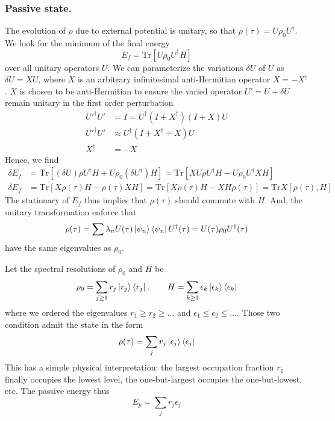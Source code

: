 \documentclass[../../../main.tex]{subfiles}
\begin{document}
\subsubsection{Passive state.}
The evolution of $\rho$ due to external potential is unitary, so that $\rho(\tau ) = U \rho_0 U ^\dagger$.
We look for the minimum of the final energy
\begin{equation*}
  E_f = \mathrm{Tr}  [U \rho_0 U ^\dagger H]
\end{equation*}
over all unitary operators $U$.
We can parameterize the variations $\delta U$ of $U$ as $\delta U = X U$, where $X$ is an arbitrary infinitesimal anti-Hermitian operator $X = -X ^\dagger$.
$X$ is chosen to be anti-Hermitian to ensure the varied operator $U'=U + \delta U$ remain unitary in the first order perturbation
\begin{align*}
  U'^\dagger U' & = I = U^\dagger(I+X ^ \dagger) ( I + X ) U \\
  U'^\dagger U' & \approx U^\dagger (I + X ^\dagger + X) U   \\
  X ^\dagger    & = - X
\end{align*}
Hence, we find
\begin{align*}
  \delta E_f & =  \mathrm{Tr} [(\delta U)\rho U ^\dagger H + U \rho_0(\delta U ^\dagger)H]  =  \mathrm{Tr} [X U \rho U ^\dagger H - U \rho_0U ^\dagger XH] \\
  \delta E_f & = \mathrm{Tr}  [X\rho(\tau ) H-\rho(\tau )X H] = \mathrm{Tr}  [X\rho(\tau ) H-X H\rho(\tau )] = \mathrm{Tr} X[\rho(\tau ), H]
\end{align*}
The stationary of $E_f$ thus implies that $\rho(\tau )$ should commute with $H$.
And, the unitary transformation enforce that
\begin{equation*}
  \rho(\tau)= \sum \lambda_n U(\tau) \ket{\psi_n}\bra{\psi_n}U ^\dagger(\tau) = U(\tau)\rho_0U ^\dagger(\tau)
\end{equation*}
have the same eigenvalues as $\rho_0$.

Let the spectral resolutions of $\rho_0$ and $H$ be
\begin{equation*}
  \rho_0 = \sum_{j\geq 1} r_j \ket{ r_j}\bra{ r_j}, \qquad H = \sum_{k \geq 1} \epsilon_k \ket{\epsilon_k}\bra{\epsilon_k}
\end{equation*}
where we ordered the eigenvalues $  r_1 \geq r_2 \geq \ldots$ and $ \epsilon_1 \leq \epsilon_2 \leq \ldots$.
Those two condition admit the state in the form
\begin{equation*}
  \rho(\tau) = \sum_{j}r_j \ket{\epsilon_j} \bra{\epsilon_j}
\end{equation*}
This has a simple physical interpretation: the largest occupation fraction $r_1$ finally occupies the lowest level, the one-but-largest occupies the one-but-lowest, etc.
The passive energy thus
\begin{equation*}
  E_p = \sum_{j} r_j\epsilon_j
\end{equation*}
\end{document}
